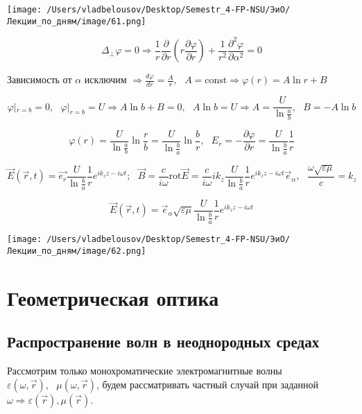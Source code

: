 \documentclass[12pt, a4paper]{report}
\begin{document}
\begin{center}
    \texttt{[image: /Users/vladbelousov/Desktop/Semestr\_4-FP-NSU/ЭиО/Лекции\_по\_дням/image/61.png]}
\end{center}

\[ \Delta _{ \perp  }\varphi = 0 \Rightarrow \frac{1}{r } \frac{\partial  }{\partial  r }\left(  r \frac{ \partial  \varphi }{\partial  r }  \right) + \frac{1}{r ^2 } \frac{\partial  ^2 \varphi }{\partial  \alpha ^2 }  =0   \] 

Зависимость от \( \alpha \) исключим \( \displaystyle \Rightarrow \frac{d \varphi }{dr  } =\frac{A }{r} , \text{ } A = \mathrm{const} \Rightarrow \varphi (r ) = A \ln r + B   \) 

\[ \varphi|_{r = b} =  0 ,\text{ } \varphi |_{r = b} =U \Rightarrow A \ln  b + B = 0 , \text{ } A \ln b = U \Rightarrow A = \frac{U }{\ln  \frac{a}{b} } , \text{ } B = -A \ln b   \] 

\[ \varphi(r ) = \frac{U }{\ln \frac{a}{b } } \ln \frac{r}{b }  = \frac{U }{\ln \frac{b}{a} } \ln \frac{b}{r}  , \text{ }  E_{r }  = - \frac{\partial  \varphi }{\partial  r } = \frac{U }{\ln \frac{b}{a} } \frac{1}{r}    \] 

\[ \vec{E } (\vec{r } ,t ) = \vec{e_r } \frac{U }{\ln \frac{b}{a} } \frac{1}{r} e^{i k_z z - i\omega t } ; \text{ } \vec{B } = \frac{c}{i \omega} \mathrm{rot } \vec{E } = \frac{c}{i \omega } i k_z  \frac{U }{\ln \frac{b}{a} } \frac{1}{r} e^{i k_z z - i \omega t }\vec{e } _{\alpha}   , \text{ } \frac{ \omega \sqrt{\varepsilon \mu } }{c } = k_z         \] 

\[ \vec{E } (\vec{r } ,t ) = \vec{e } _{\alpha } \sqrt{ \varepsilon \mu }  \frac{U }{\ln \frac{b}{a} } \frac{1}{r} e^{i k_z z - i \omega t }   \] 

\begin{center}
    \texttt{[image: /Users/vladbelousov/Desktop/Semestr\_4-FP-NSU/ЭиО/Лекции\_по\_дням/image/62.png]}
\end{center}

\chapter{Геометрическая оптика}

\section{Распространение волн в неоднородных средах}

Рассмотрим только монохроматические электромагнитные волны \( \varepsilon ( \omega , \vec{r } ) , \text{ }  \mu (\omega ,\vec{r} ) \), будем рассматривать частный случай при заданной \( \omega \Rightarrow \varepsilon (\vec{r } ), \mu ( \vec{r } ) \). 
\end{document}
